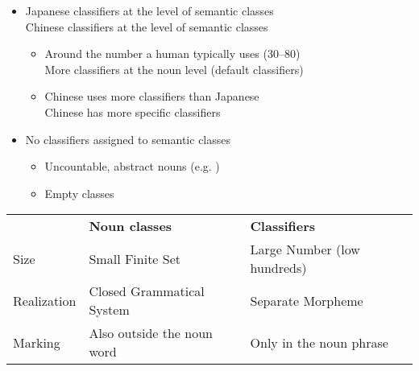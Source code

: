 \documentclass[headrule,footrule]{foils}
\begin{document}

\begin{itemize}
\item   %
   Japanese classifiers at the level of semantic classes\\
   Chinese classifiers at the level of semantic classes
  \begin{itemize}
  \item Around the number a human typically uses (30--80)\\
    More classifiers at the noun level (default classifiers)
  \item Chinese uses more classifiers than Japanese\\
        Chinese has more specific classifiers

   \end{itemize}
\item No classifiers assigned to  semantic classes %
  \begin{itemize}
    \item Uncountable, abstract nouns (e.g.  ) 
    \item Empty classes
  \end{itemize}
\end{itemize}


\noindent\begin{tabular}{lll}
  & \textbf{Noun classes} & \textbf{Classifiers} \\
Size & Small Finite Set & Large Number (low hundreds) \\
Realization & Closed Grammatical System & Separate Morpheme \\
Marking & Also outside the noun word & Only in the noun phrase
\end{tabular}
\end{document}
